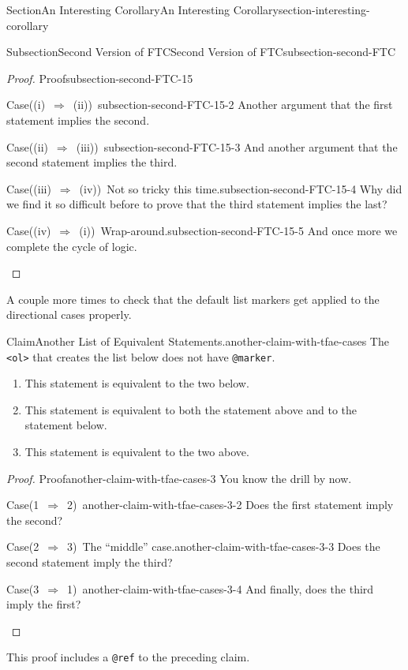 \documentclass[twoside,10pt,]{article}
\newcommand{\mono}[1]{\texttt{#1}}
\DeclareRobustCommand{\acronymintitle}[1]{\texorpdfstring{#1}{#1}}
\numberwithin{equation}{section}
\begin{document}
\begin{sectionptx}{Section}{An Interesting Corollary}{}{An Interesting Corollary}{}{}{section-interesting-corollary}
\begin{subsectionptx}{Subsection}{Second Version of \acronymintitle{FTC}}{}{Second Version of \acronymintitle{FTC}}{}{}{subsection-second-FTC}
\begin{proof}{Proof}{}{subsection-second-FTC-15}
\begin{case}{Case}{((i) $\Rightarrow$ (ii)) }{}{subsection-second-FTC-15-2}
Another argument that the first statement implies the second.%
\end{case}
\begin{case}{Case}{((ii) $\Rightarrow$ (iii)) }{}{subsection-second-FTC-15-3}
And another argument that the second statement implies the third.%
\end{case}
\begin{case}{Case}{((iii) $\Rightarrow$ (iv)) }{Not so tricky this time.}{subsection-second-FTC-15-4}
Why did we find it so difficult before to prove that the third statement implies the last?%
\end{case}
\begin{case}{Case}{((iv) $\Rightarrow$ (i)) }{Wrap-around.}{subsection-second-FTC-15-5}
And once more we complete the cycle of logic.%
\end{case}
\end{proof}
A couple more times to check that the default list markers get applied to the directional cases properly.%
\begin{claim}{Claim}{Another List of Equivalent Statements.}{}{another-claim-with-tfae-cases}%
The \mono{<ol>} that creates the list below does not have \mono{@marker}.%
\begin{enumerate}
\item{}This statement is equivalent to the two below.%
\item{}This statement is equivalent to both the statement above and to the statement below.%
\item{}This statement is equivalent to the two above.%
\end{enumerate}
%
\end{claim}
\begin{proof}{Proof}{}{another-claim-with-tfae-cases-3}
You know the drill by now.%
\begin{case}{Case}{(1 $\Rightarrow$ 2) }{}{another-claim-with-tfae-cases-3-2}
Does the first statement imply the second?%
\end{case}
\begin{case}{Case}{(2 $\Rightarrow$ 3) }{The ``middle'' case.}{another-claim-with-tfae-cases-3-3}
Does the second statement imply the third?%
\end{case}
\begin{case}{Case}{(3 $\Rightarrow$ 1) }{}{another-claim-with-tfae-cases-3-4}
And finally, does the third imply the first?%
\end{case}
\end{proof}
This proof includes a \mono{@ref} to the preceding claim.%

\end{subsectionptx}
\end{sectionptx}
\end{document}
